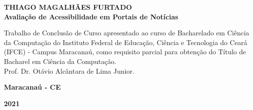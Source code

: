 \documentclass[a4paper]{article}
\begin{document}
\begin{titlepage}
	\vfill
	\begin{center}
		\fontsize{12pt}{0pt}\selectfont
		{\large \textbf{THIAGO MAGALHÃES FURTADO}} \\[2.5cm]
		\fontsize{12pt}{0pt}\selectfont
		{\large \textbf{Avaliação de Acessibilidade em Portais de Notícias}}\\[3cm]
		
		\hspace{.45\textwidth} %
		\begin{minipage}{.5\textwidth}
			\large Trabalho de Conclusão de Curso apresentado ao curso de Bacharelado em Ciência da Computação do Instituto Federal de Educação, Ciência e Tecnologia do Ceará (IFCE) - Campus Maracanaú, como requisito parcial para obtenção do Título de Bacharel em Ciência da Computação.\\[1cm]
			Prof. Dr. Otávio Alcântara de Lima Junior.
		\end{minipage}
		\vfill
		\vspace{2cm}		
		\large \textbf{Maracanaú - CE}
		
		\large \textbf{2021}
	\end{center}
\end{titlepage}
\end{document}
